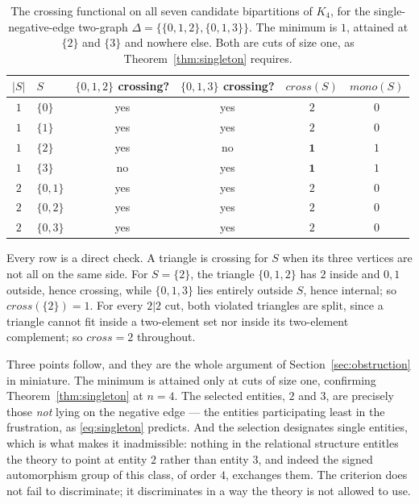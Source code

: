 \documentclass[11pt,a4paper]{article}
\def\mathrm#1{#1}%
\newcommand{\Kfour}{K_4}
\newcommand{\cross}{\mathrm{cross}}
\newcommand{\mono}{\mathrm{mono}}
\begin{document}
\begin{table}[h]
\centering
\small
\begin{tabular}{clcccc}
\toprule
$|S|$ & $S$ & $\{0,1,2\}$ crossing? & $\{0,1,3\}$ crossing? & $\cross(S)$ & $\mono(S)$ \\
\midrule
$1$ & $\{0\}$   & yes & yes & $2$ & $0$ \\
$1$ & $\{1\}$   & yes & yes & $2$ & $0$ \\
$1$ & $\{2\}$   & yes & no  & $\mathbf{1}$ & $1$ \\
$1$ & $\{3\}$   & no  & yes & $\mathbf{1}$ & $1$ \\
\midrule
$2$ & $\{0,1\}$ & yes & yes & $2$ & $0$ \\
$2$ & $\{0,2\}$ & yes & yes & $2$ & $0$ \\
$2$ & $\{0,3\}$ & yes & yes & $2$ & $0$ \\
\bottomrule
\end{tabular}
\caption{The crossing functional on all seven candidate bipartitions of $\Kfour$, for the single-negative-edge two-graph $\Delta=\{\{0,1,2\},\{0,1,3\}\}$. The minimum is $1$, attained at $\{2\}$ and $\{3\}$ and nowhere else. Both are cuts of size one, as Theorem~\ref{thm:singleton} requires.}
\label{tab:worked_cross}
\end{table}

Every row is a direct check. A triangle is crossing for $S$ when its three vertices are not all on the same side. For $S=\{2\}$, the triangle $\{0,1,2\}$ has $2$ inside and $0,1$ outside, hence crossing, while $\{0,1,3\}$ lies entirely outside $S$, hence internal; so $\cross(\{2\})=1$. For every $2|2$ cut, both violated triangles are split, since a triangle cannot fit inside a two-element set nor inside its two-element complement; so $\cross=2$ throughout.

Three points follow, and they are the whole argument of Section~\ref{sec:obstruction} in miniature. The minimum is attained only at cuts of size one, confirming Theorem~\ref{thm:singleton} at $n=4$. The selected entities, $2$ and $3$, are precisely those \emph{not} lying on the negative edge --- the entities participating least in the frustration, as \eqref{eq:singleton} predicts. And the selection designates single entities, which is what makes it inadmissible: nothing in the relational structure entitles the theory to point at entity $2$ rather than entity $3$, and indeed the signed automorphism group of this class, of order $4$, exchanges them. The criterion does not fail to discriminate; it discriminates in a way the theory is not allowed to use.
\end{document}
